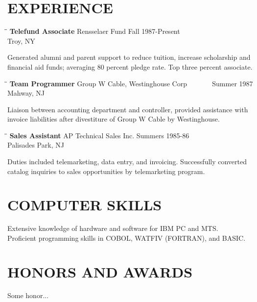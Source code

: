 \documentclass[12pt,A4]{res}
\begin{document}
\begin{resume}
     
\section{EXPERIENCE}
   \vspace{-0.1in}	
   \begin{tabbing}
   \hspace{2.0in}\= \hspace{2.0in}\= \kill %
    {\bf Telefund Associate} \>Rensselaer Fund     \>Fall 1987-Present\\
                             \>Troy, NY
   \end{tabbing}\vspace{-20pt}      %
    Generated alumni and parent support to reduce tuition,          
    increase scholarship and financial aid funds; averaging 80          
    percent pledge rate. Top three percent associate.
   \begin{tabbing}
   \hspace{2.0in}\= \hspace{2.0in}\= \kill %
    {\bf Team Programmer} \>Group W Cable, Westinghouse Corp \> ~~~~~~ Summer 1987\\
                          \>Mahway, NJ
   \end{tabbing}\vspace{-20pt}
    Liaison between accounting department and controller,          
    provided assistance with invoice liabilities after          
    divestiture of Group W Cable by Westinghouse.
   \begin{tabbing}%
   \hspace{2.0in}\= \hspace{2.0in}\= \kill %
   {\bf Sales Assistant}  \>AP Technical Sales Inc. \> Summers  1985-86\\
                          \>Palisades Park, NJ
   \end{tabbing}\vspace{-20pt}
    Duties included telemarketing, data entry, and invoicing.          
    Successfully converted catalog inquiries to sales          
    opportunities by telemarketing program.          


\section{COMPUTER SKILLS}          
    Extensive knowledge of hardware and software for IBM PC and          
    MTS. \\         
    Proficient programming skills in COBOL, WATFIV (FORTRAN), and          
    BASIC.          
 
 
\section{HONORS AND AWARDS}          
    Some honor... 

\end{resume}
\end{document}
